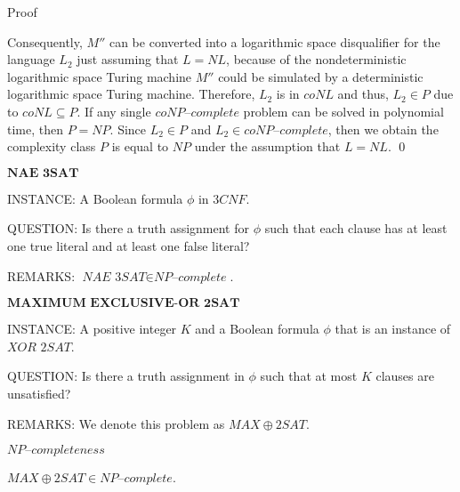 \documentclass[11pt]{beamer}
\begin{document}
\begin{frame}{Proof}

Consequently, $M''$ can be converted into a logarithmic space disqualifier for the language $L_{2}$ just assuming that $L = NL$, because of the nondeterministic logarithmic space Turing machine $M''$ could be simulated by a deterministic logarithmic space Turing machine. Therefore, $L_{2}$ is in $coNL$ and thus, $L_{2} \in P$ due to $coNL \subseteq P$. If any single $\textit{coNP--complete}$ problem can be solved in polynomial time, then $P = NP$. Since $L_{2} \in P$ and $L_{2} \in \textit{coNP--complete}$, then we obtain the complexity class $P$ is equal to $NP$ under the assumption that $L = NL$. \qed

\end{frame}

\begin{frame}{$\textbf{NAE 3SAT}$}

\begin{definition}
INSTANCE: A Boolean formula $\phi$ in $3CNF$.

QUESTION: Is there a truth assignment for $\phi$ such that each clause has at least one true literal and at least one false literal?

REMARKS: $\textit{NAE 3SAT} \in \textit{NP--complete}$.
\end{definition}

\end{frame}

\begin{frame}{$\textbf{MAXIMUM EXCLUSIVE-OR 2SAT}$}

\begin{definition}
INSTANCE: A positive integer $K$ and a Boolean formula $\phi$ that is an instance of $\textit{XOR 2SAT}$.

QUESTION: Is there a truth assignment in $\phi$ such that at most $K$ clauses are unsatisfied?

REMARKS: We denote this problem as $MAX\oplus2SAT$.
\end{definition}

\end{frame}

\begin{frame}{$\textit{NP--completeness}$}

\begin{theorem}
\label{completeness}
$MAX\oplus2SAT \in \textit{NP--complete}$.
\end{theorem}

\end{frame}
\end{document}
